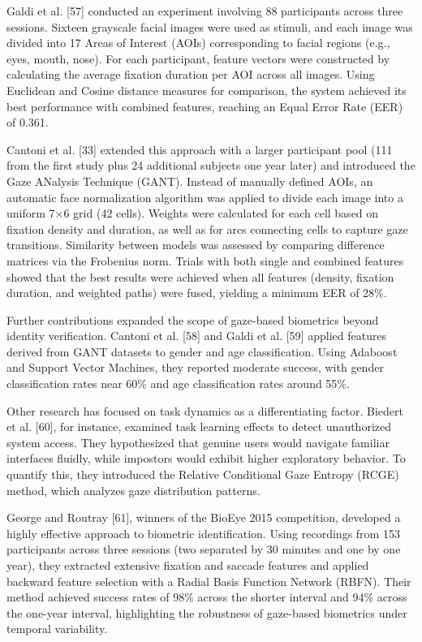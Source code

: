 \documentclass{article}
\begin{document}
Galdi et al. [57] conducted an experiment involving 88 participants across three sessions. 
Sixteen grayscale facial images were used as stimuli, and each image was divided into 17 Areas of Interest (AOIs) corresponding to facial regions (e.g., eyes, mouth, nose). 
For each participant, feature vectors were constructed by calculating the average fixation duration per AOI across all images. 
Using Euclidean and Cosine distance measures for comparison, the system achieved its best performance with combined features, reaching an Equal Error Rate (EER) of 0.361.

Cantoni et al. [33] extended this approach with a larger participant pool (111 from the first study plus 24 additional subjects one year later) and introduced the Gaze ANalysis Technique (GANT). 
Instead of manually defined AOIs, an automatic face normalization algorithm was applied to divide each image into a uniform 7×6 grid (42 cells).
Weights were calculated for each cell based on fixation density and duration, as well as for arcs connecting cells to capture gaze transitions. 
Similarity between models was assessed by comparing difference matrices via the Frobenius norm. Trials with both single and combined features showed that the best results were achieved when all features (density, fixation duration, and weighted paths) were fused, yielding a minimum EER of 28\%.

Further contributions expanded the scope of gaze-based biometrics beyond identity verification. Cantoni et al. [58] and Galdi et al. [59] applied features derived from GANT datasets to gender and age classification.
Using Adaboost and Support Vector Machines, they reported moderate success, with gender classification rates near 60\% and age classification rates around 55\%.

Other research has focused on task dynamics as a differentiating factor. Biedert et al. [60], for instance, examined task learning effects to detect unauthorized system access. 
They hypothesized that genuine users would navigate familiar interfaces fluidly, while impostors would exhibit higher exploratory behavior. 
To quantify this, they introduced the Relative Conditional Gaze Entropy (RCGE) method, which analyzes gaze distribution patterns.

George and Routray [61], winners of the BioEye 2015 competition, developed a highly effective approach to biometric identification. 
Using recordings from 153 participants across three sessions (two separated by 30 minutes and one by one year), they extracted extensive fixation and saccade features and applied backward feature selection with a Radial Basis Function Network (RBFN). 
Their method achieved success rates of 98\% across the shorter interval and 94\% across the one-year interval, highlighting the robustness of gaze-based biometrics under temporal variability.
\end{document}
